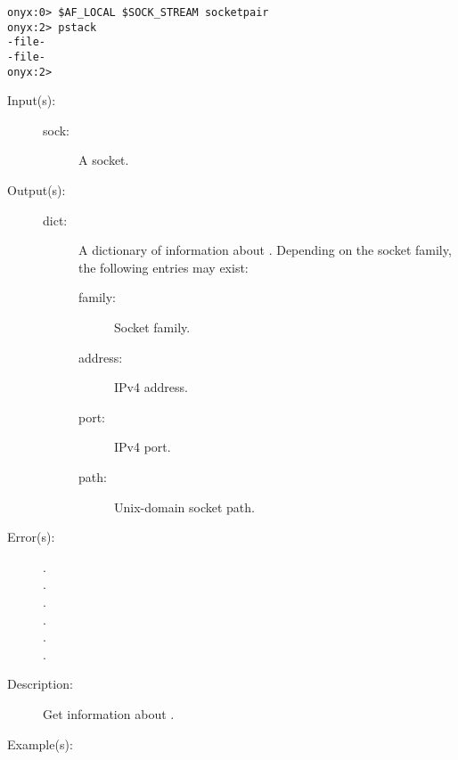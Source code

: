 \begin{description}
\begin{description}
\begin{verbatim}
onyx:0> $AF_LOCAL $SOCK_STREAM socketpair
onyx:2> pstack
-file-
-file-
onyx:2>
		\end{verbatim}
	\end{description}
\label{systemdict:sockname}
\item[{\onyxop{sock}{sockname}{dict}}: ]
	\begin{description}\item[]
	\item[Input(s): ]
		\begin{description}\item[]
		\item[sock: ]
			A socket.
		\end{description}
	\item[Output(s): ]
		\begin{description}\item[]
		\item[dict: ]
			A dictionary of information about .
			Depending on the socket family, the following entries
			may exist:
			\begin{description}%
			\item[family: ] Socket family.
			\item[address: ] IPv4 address.
			\item[port: ] IPv4 port.
			\item[path: ] Unix-domain socket path.
			\end{description}
		\end{description}
	\item[Error(s): ]
		\begin{description}\item[]
		\item[.]
		\item[.]
		\item[.]
		\item[.]
		\item[.]
		\item[.]
		\end{description}
	\item[Description: ]
		Get information about .
	\item[Example(s): ]\begin{verbatim}


\end{verbatim}
\end{description}
\end{description}
